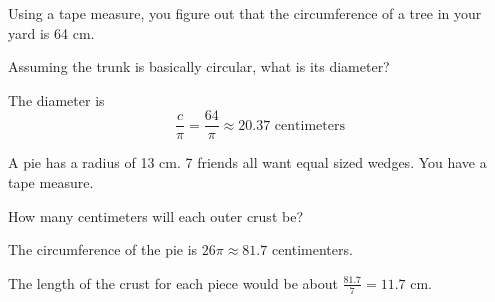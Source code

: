 \begin{Exercise}[title={Circumference}, label=circumference]

  Using a tape measure, you figure out that the circumference of a tree in your yard is 64 cm.

  Assuming the trunk is basically circular,  what is its diameter?
  
\end{Exercise}
\begin{Answer}[ref=circumference]

  The diameter is $$\frac{c}{\pi} = \frac{64}{\pi} \approx 20.37 \text{ centimeters}$$
  
\end{Answer}
\begin{Exercise}[title={Splitting a Pie}, label=pie_splitting]

  A pie has a radius of 13 cm.  7 friends all want equal sized wedges.  You have a tape measure.

  How many centimeters will each outer crust be?

\end{Exercise}
\begin{Answer}[ref=pie_splitting]

  The circumference of the pie is $26 \pi \approx 81.7$ centimenters.
  
  The length of the crust for each piece would be about $\frac{81.7}{7} = 11.7$ cm.

  
\end{Answer}



